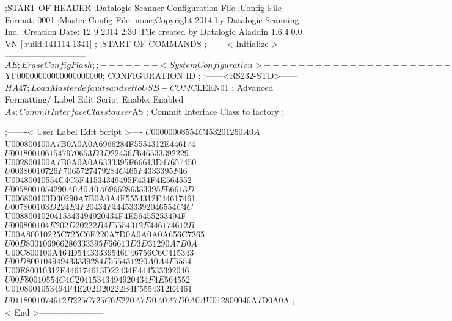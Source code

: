 ;START OF HEADER
;Datalogic Scanner Configuration File
;Config File Format: 0001
;Master Config File: none;Copyright 2014 by Datalogic Scanning Inc.
;Creation Date: 12 9 2014 2:30
;File created by Datalogic Aladdin 1.6.4.0.0 VN [build:141114.1341]
;
;START OF COMMANDS
;-------< Initialize >-----------------------------
$AE                 ; Erase Config Flash
;
;-------< System Configuration >-------------------------------
$YF00000000000000000000; CONFIGURATION ID
;
;------<RS232-STD>------
$HA47               ; Load Master defaults and set to USB-COM
$CLEEN01            ; Advanced Formatting/ Label Edit Script Enable: Enabled
$As                 ; Commit Interface Class to user
$AS                 ; Commit Interface Class to factory
;

;-------< User Label Edit Script >----
$U00000008554C453201260A0A
$U000800100A7B0A0A0A6966284F5554312E446174
$U0018001061547970653D3D22436F646533392229
$U002800100A7B0A0A0A6333395F66613D47657450
$U00380010726F7065727479284C465F4333395F46
$U00480010554C4C5F41534349495F434F4E564552
$U0058001054290A0A0A0A6966286333395F66613D
$U006800103D30290A7B0A0A4F5554312E44617461
$U007800103D224E4F20434F444533392046554C4C
$U0088001020415343494920434F4E56455253494F
$U009800104E202D20222B4F5554312E446174612B
$U00A80010225C725C6E220A7D0A0A0A0A656C7365
$U00B800106966286333395F66613D3D31290A7B0A
$U00C800100A464D54433339546F46756C6C415343
$U00D800104949433339284F555431290A0A4F5554
$U00E80010312E446174613D22434F444533392046
$U00F80010554C4C20415343494920434F4E564552
$U0108001053494F4E202D20222B4F5554312E4461
$U0118001074612B225C725C6E220A7D0A0A7D0A0A
$U012800040A7D0A0A
;------< End >-----------------------
